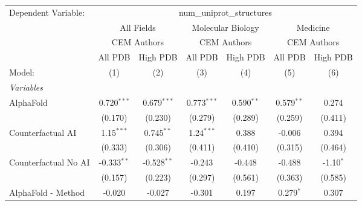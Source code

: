 \begingroup
\centering
\begin{tabular}{lcccccc}
   \tabularnewline \midrule \midrule
   Dependent Variable: & \multicolumn{6}{c}{num\_uniprot\_structures}\\
 & \multicolumn{2}{c}{All Fields} & \multicolumn{2}{c}{Molecular Biology} & \multicolumn{2}{c}{Medicine} \\
\cmidrule(lr){2-3} \cmidrule(lr){4-5} \cmidrule(lr){6-7}
 & \multicolumn{2}{c}{CEM Authors} & \multicolumn{2}{c}{CEM Authors} & \multicolumn{2}{c}{CEM Authors} \\
\cmidrule(lr){2-3} \cmidrule(lr){4-5} \cmidrule(lr){6-7}
 & \multicolumn{1}{c}{All PDB} & \multicolumn{1}{c}{High PDB} & \multicolumn{1}{c}{All PDB} & \multicolumn{1}{c}{High PDB} & \multicolumn{1}{c}{All PDB} & \multicolumn{1}{c}{High PDB} \\
\cmidrule(lr){2-2} \cmidrule(lr){3-3} \cmidrule(lr){4-4} \cmidrule(lr){5-5} \cmidrule(lr){6-6} \cmidrule(lr){7-7}
   Model:                                                     & (1)           & (2)           & (3)           & (4)           & (5)            & (6)\\  
   \midrule
   \emph{Variables}\\
   AlphaFold                                                  & 0.720$^{***}$ & 0.679$^{***}$ & 0.773$^{***}$ & 0.590$^{**}$  & 0.579$^{**}$   & 0.274\\   
                                                              & (0.170)       & (0.230)       & (0.279)       & (0.289)       & (0.259)        & (0.411)\\   
   Counterfactual AI                                          & 1.15$^{***}$  & 0.745$^{**}$  & 1.24$^{***}$  & 0.388         & -0.006         & 0.394\\   
                                                              & (0.333)       & (0.306)       & (0.411)       & (0.410)       & (0.315)        & (0.464)\\   
   Counterfactual No AI                                       & -0.333$^{**}$ & -0.528$^{**}$ & -0.243        & -0.448        & -0.488         & -1.10$^{*}$\\   
                                                              & (0.157)       & (0.223)       & (0.297)       & (0.561)       & (0.363)        & (0.585)\\   
   AlphaFold - Method                                         & -0.020        & -0.027        & -0.301        & 0.197         & 0.279$^{*}$    & 0.307\\   

\end{tabular}

